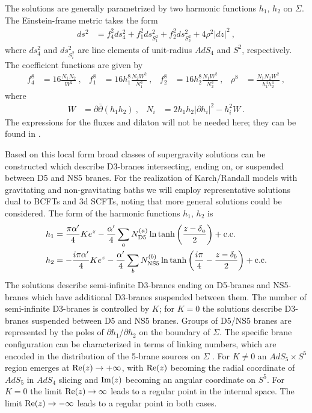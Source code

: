 \documentclass[aps,prd,11pt,notitlepage,longbibliography,nofootinbib,tightenlines,preprintnumbers]{revtex4-1}
\def\Im{\mathop{\rm Im}}
\def\Re{\mathop{\rm Re}}
\begin{document}
The solutions are generally parametrized by two harmonic functions $h_1$, $h_2$ on $\Sigma$.
The Einstein-frame metric takes the form
\begin{align}\label{eq:10d-metric}
	ds^2&=f_4^2 ds^2_{4}+f_1^2 ds^2_{S_1^2}+f_2^2 ds^2_{S_2^2}+4\rho^2 |dz|^2~,
\end{align}
where $ds^2_{4}$ and $ds^2_{S_i^2}$ are line elements of unit-radius $AdS_4$ and $S^2$, respectively.
The coefficient functions are given by
\begin{align}
	f_4^8&=16\frac{N_1N_2}{W^2}~, & f_1^8&=16h_1^8\frac{N_2 W^2}{N_1^3}~, & f_2^8&=16 h_2^8 \frac{N_1 W^2}{N_2^3}~,
	&
	\rho^8&=\frac{N_1N_2W^2}{h_1^4h_2^4}~,
\end{align}
where
\begin{align}
	W&=\partial\bar\partial (h_1 h_2)~, & N_i &=2h_1 h_2 |\partial h_i|^2 -h_i^2 W~.
\end{align}
The expressions for the fluxes and dilaton will not be needed here; they can be found in \cite{DHoker:2007zhm,DHoker:2007hhe,Aharony:2011yc,Assel:2011xz}.

Based on this local form broad classes of supergravity solutions can be constructed which describe D3-branes intersecting, ending on, or suspended between D5 and NS5 branes.
For the realization of Karch/Randall models with gravitating and non-gravitating baths we will employ representative solutions dual to BCFTs and 3d SCFTs, noting that more general solutions could be considered.
The form of the harmonic functions $h_1$, $h_2$ is
\begin{align}
	h_1&=\frac{\pi \alpha^\prime}{4} K e^z-\frac{\alpha^\prime}{4} \sum_{a}N_{\rm D5}^{(a)}\ln\tanh\left(\frac{z-\delta_a}{2}\right)+\rm{c.c.}
	\nonumber\\
	h_2&=-\frac{i \pi \alpha^\prime}{4} K e^z-\frac{\alpha^\prime}{4}\sum_b N_{\rm NS5}^{(b)}\ln\tanh\left(\frac{i\pi}{4}-\frac{z-\delta_b}{2}\right)+\rm{c.c.}
\end{align}
The solutions describe semi-infinite D3-branes ending on D5-branes and NS5-branes which have additional D3-branes suspended between them.
The number of semi-infinite D3-branes is controlled by $K$; for $K=0$ the solutions describe D3-branes suspended between D5 and NS5 branes.
Groups of D5/NS5 branes are represented by the poles of $\partial h_1$/$\partial h_2$ on the boundary of $\Sigma$.
The specific brane configuration can be characterized in terms of linking numbers, which are encoded in the distribution of the 5-brane sources on $\Sigma$ \cite{Aharony:2011yc,Assel:2011xz}.
For $K\neq 0$ an $AdS_5\times S^5$ region emerges at $\Re(z)\rightarrow + \infty$, with $\Re(z)$ becoming the radial coordinate of $AdS_5$ in $AdS_4$ slicing and $\Im(z)$ becoming an angular coordinate on $S^5$.
For $K=0$ the limit $\Re(z)\rightarrow\infty$ leads to a regular point in the internal space.
The limit $\Re(z)\rightarrow -\infty$ leads to a regular point in both cases.
\end{document}

